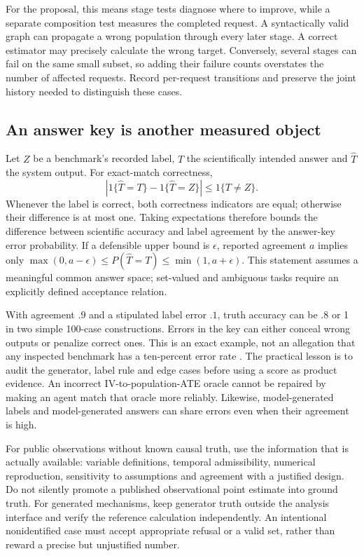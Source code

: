 For the proposal, this means stage tests diagnose where to improve, while a
separate composition test measures the completed request. A syntactically
valid graph can propagate a wrong population through every later stage. A
correct estimator may precisely calculate the wrong target. Conversely,
several stages can fail on the same small subset, so adding their failure
counts overstates the number of affected requests. Record per-request
transitions and preserve the joint history needed to distinguish these cases.

\subsection{An answer key is another measured object}

Let $Z$ be a benchmark's recorded label, $T$ the scientifically intended answer
and $\widehat T$ the system output. For exact-match correctness,
\begin{equation}
 \left|1\{\widehat T=T\}-1\{\widehat T=Z\}\right|
 \leq1\{T\ne Z\}.
 \label{exec13:frontier-oracle}
\end{equation}
Whenever the label is correct, both correctness indicators are equal;
otherwise their difference is at most one. Taking expectations therefore
bounds the difference between scientific accuracy and label agreement by the
answer-key error probability. If a defensible upper bound is $\epsilon$,
reported agreement $a$ implies only
$\max(0,a-\epsilon)\leq P(\widehat T=T)\leq\min(1,a+\epsilon)$.
This statement assumes a meaningful common answer space; set-valued and
ambiguous tasks require an explicitly defined acceptance relation.

With agreement $.9$ and a stipulated label error $.1$, truth accuracy can be
$.8$ or 1 in two simple 100-case constructions. Errors in the key can either
conceal wrong outputs or penalize correct ones. This is an exact example, not
an allegation that any inspected benchmark has a ten-percent error rate
\cite{exec13_frontier_exact}. The practical lesson is to audit the generator,
label rule and edge cases before using a score as product evidence. An
incorrect IV-to-population-ATE oracle cannot be repaired by making an agent
match that oracle more reliably. Likewise, model-generated labels and
model-generated answers can share errors even when their agreement is high.

For public observations without known causal truth, use the information that
is actually available: variable definitions, temporal admissibility, numerical
reproduction, sensitivity to assumptions and agreement with a justified design.
Do not silently promote a published observational point estimate into ground
truth. For generated mechanisms, keep generator truth outside the analysis
interface and verify the reference calculation independently. An intentional
nonidentified case must accept appropriate refusal or a valid set, rather than
reward a precise but unjustified number.

